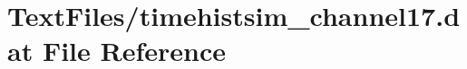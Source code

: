 \hypertarget{TextFiles_2timehistsim__channel17_8dat}{}\section{Text\+Files/timehistsim\+\_\+channel17.dat File Reference}
\label{TextFiles_2timehistsim__channel17_8dat}
